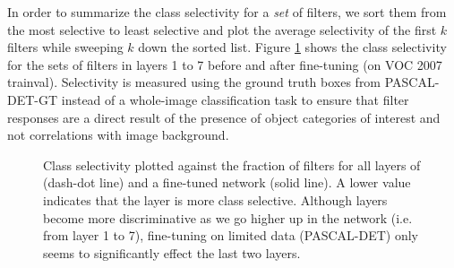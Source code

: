 In order to summarize the class selectivity for a \emph{set} of filters, we sort them from the most selective to least selective and plot the average selectivity of the first $k$ filters while sweeping $k$ down the sorted list.
Figure \ref{fig:fine-entropy} shows the class selectivity for the sets of filters in layers 1 to 7 before and after fine-tuning (on VOC 2007 trainval).
Selectivity is measured using the ground truth boxes from PASCAL-DET-GT instead of a whole-image classification task to ensure that filter responses are a direct result of the presence of object categories of interest and not correlations with image background.

\begin{figure}[t!]
\centering
{}
\caption{Class selectivity plotted against the fraction of filters for all layers of  (dash-dot line) and a fine-tuned network (solid line). A lower value indicates that the layer is more class selective. Although layers become more discriminative as we go higher up in the network (i.e. from layer 1 to 7), fine-tuning on limited data (PASCAL-DET) only seems to significantly effect the last two layers.}
\label{fig:fine-entropy}
\end{figure}

